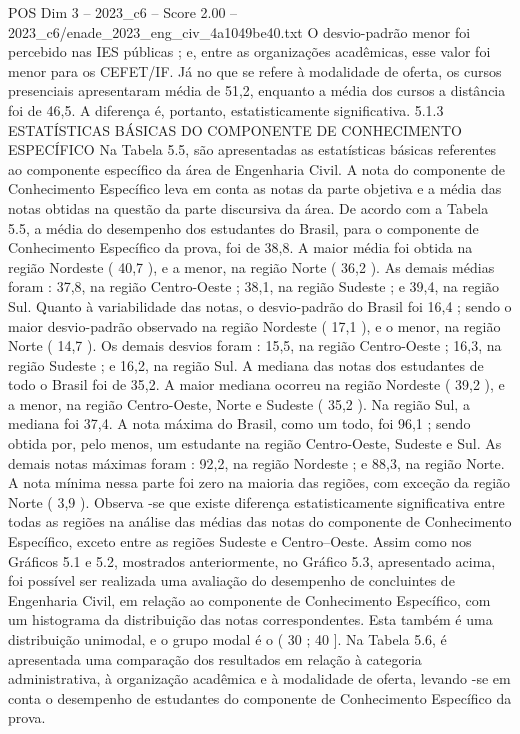 \begin{textsample}{POS Dim 3 – 2023\_c6 – Score 2.00 – 2023\_c6/enade\_2023\_eng\_civ\_4a1049be40.txt}
O desvio-padrão menor foi percebido nas IES públicas ; e, entre as organizações acadêmicas, esse valor foi menor para os CEFET/IF.
Já no que se refere à modalidade de oferta, os cursos presenciais apresentaram média de 51,2, enquanto a média dos cursos a distância foi de 46,5.
A diferença é, portanto, estatisticamente significativa. 5.1.3 ESTATÍSTICAS BÁSICAS DO COMPONENTE DE CONHECIMENTO ESPECÍFICO Na Tabela 5.5, são apresentadas as estatísticas básicas referentes ao componente específico da área de Engenharia Civil.
A nota do componente de Conhecimento Específico leva em conta as notas da parte objetiva e a média das notas obtidas na questão da parte discursiva da área.
De acordo com a Tabela 5.5, a média do desempenho dos estudantes do Brasil, para o componente de Conhecimento Específico da prova, foi de 38,8.
A maior média foi obtida na região Nordeste ( 40,7 ), e a menor, na região Norte ( 36,2 ).
As demais médias foram : 37,8, na região Centro-Oeste ; 38,1, na região Sudeste ; e 39,4, na região Sul.
Quanto à variabilidade das notas, o desvio-padrão do Brasil foi 16,4 ; sendo o maior desvio-padrão observado na região Nordeste ( 17,1 ), e o menor, na região Norte ( 14,7 ).
Os demais desvios foram : 15,5, na região Centro-Oeste ; 16,3, na região Sudeste ; e 16,2, na região Sul.
A mediana das notas dos estudantes de todo o Brasil foi de 35,2.
A maior mediana ocorreu na região Nordeste ( 39,2 ), e a menor, na região Centro-Oeste, Norte e Sudeste ( 35,2 ).
Na região Sul, a mediana foi 37,4.
A nota máxima do Brasil, como um todo, foi 96,1 ; sendo obtida por, pelo menos, um estudante na região Centro-Oeste, Sudeste e Sul.
As demais notas máximas foram : 92,2, na região Nordeste ; e 88,3, na região Norte.
A nota mínima nessa parte foi zero na maioria das regiões, com exceção da região Norte ( 3,9 ).
Observa -se que existe diferença estatisticamente significativa entre todas as regiões na análise das médias das notas do componente de Conhecimento Específico, exceto entre as regiões Sudeste e Centro--Oeste.
Assim como nos Gráficos 5.1 e 5.2, mostrados anteriormente, no Gráfico 5.3, apresentado acima, foi possível ser realizada uma avaliação do desempenho de concluintes de Engenharia Civil, em relação ao componente de Conhecimento Específico, com um histograma da distribuição das notas correspondentes.
Esta também é uma distribuição unimodal, e o grupo modal é o ( 30 ; 40 ].
Na Tabela 5.6, é apresentada uma comparação dos resultados em relação à categoria administrativa, à organização acadêmica e à modalidade de oferta, levando -se em conta o desempenho de estudantes do componente de Conhecimento Específico da prova.

\end{textsample}
